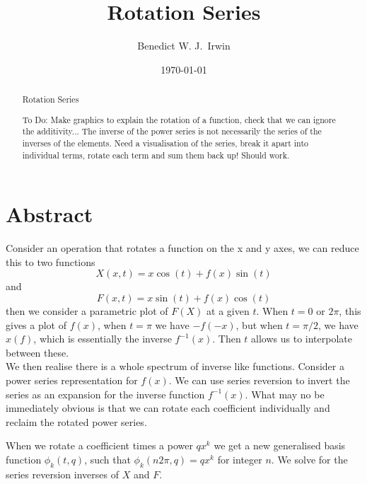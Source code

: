 \documentclass{article}
\title{Rotation Series}
\date{\today}
\begin{document}

\author[1,2]{Benedict W. J.~Irwin}


\maketitle
\begin{abstract}
Rotation Series

To Do: Make graphics to explain the rotation of a function, check that we can ignore the additivity... The inverse of the power series is not necessarily the series of the inverses of the elements. Need a visualisation of the series, break it apart into individual terms, rotate each term and sum them back up! Should work.
\end{abstract}

\section{Abstract}
Consider an operation that rotates a function on the x and y axes, we can reduce this to two functions
$$
X(x,t) = x \cos(t) + f(x) \sin(t) 
$$
and
$$
F(x,t) = x \sin(t) + f(x) \cos(t)
$$
then we consider a parametric plot of $F(X)$ at a given $t$. When $t=0$ or $2 \pi$, this gives a plot of $f(x)$, when $t=\pi$ we have $-f(-x)$, but when $t=\pi/2$, we have $x(f)$, which is essentially the inverse $f^{-1}(x)$. Then $t$ allows us to interpolate between these.\\

We then realise there is a whole spectrum of inverse like functions. Consider a power series representation for $f(x)$. We can use series reversion to invert the series as an expansion for the inverse function $f^{-1}(x)$. What may no be immediately obvious is that we can rotate each coefficient individually and reclaim the rotated power series.

When we rotate a coefficient times a power $q x^k$ we get a new generalised basis function $\phi_k(t,q)$, such that $\phi_k(n 2\pi,q)=q x^k$ for integer $n$. We solve for the series reversion inverses of $X$ and $F$. 
\end{document}
